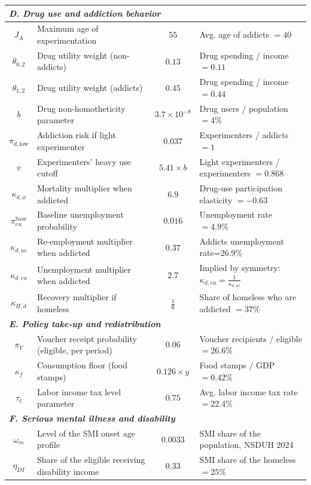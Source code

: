 \begin{table}[p]
\begin{center}
\begin{tabular}{clcl}
\midrule
\multicolumn{4}{l}{\textit{\textbf{D. Drug use and addiction behavior}}} \\
\midrule
$J_A$ & Maximum age of experimentation & $55$ & Avg. age of addicts $=40$ \\
$\theta_{0,2}$ & Drug utility weight (non-addicts) & $0.13$ & Drug spending / income $=0.11$ \\
$\theta_{1,2}$ & Drug utility weight (addicts) & $0.45$ & Drug spending / income $=0.44$ \\
$b$ & Drug non-homotheticity parameter & $3.7\times 10^{-8}$ & Drug users / population $=4\%$ \\
$\pi_{d,\text{low}}$ & Addiction risk if light experimenter & $0.037$ & Experimenters / addicts $=1$ \\
$\overline{v}$ & Experimenters' heavy use cutoff & $5.41 \times b$ & Light experimenters / experimenters $=0.868$ \\
$\kappa_{d,\phi}$ & Mortality multiplier when addicted & $6.9$ & Drug-use participation elasticity $=-0.63$ \\
$\pi^{\text{base}}_{eu}$ & Baseline unemployment probability & $0.016$ & Unemployment rate $=4.9\%$ \\
$\kappa_{d,ue}$ & Re-employment multiplier when addicted & $0.37$ & Addicts unemployment rate=26.9\%\\
$\kappa_{d,eu}$ & Unemployment multiplier when addicted & $2.7$ & Implied by symmetry: $\kappa_{d,eu}=\frac{1}{\kappa_{d,ue}}$ \\
$\kappa_{\underline H,d}$ & Recovery multiplier if homeless & $\frac{1}{6}$ & Share of homeless who are addicted $=37\%$\\
\midrule
\multicolumn{4}{l}{\textit{\textbf{E. Policy take-up and redistribution}}} \\
\midrule
$\pi_V$ & Voucher receipt probability (eligible, per period) & $0.06$ & Voucher recipients / eligible $=26.6\%$ \\
$\kappa_f$ & Consumption floor (food stamps) & $0.126\times \overline{y}$ & Food stamps / GDP $=0.42\%$ \\
$\tau_\ell$ & Labor income tax level parameter & $0.75$ & Avg. labor income tax rate $=22.4\%$ \\
\midrule
\multicolumn{4}{l}{\textit{\textbf{F. Serious mental illness and disability}}} \\
\midrule
$\omega_m$ & Level of the SMI onset age profile & $0.0033$ & SMI share of the population, NSDUH 2024 \\
$\eta_{DI}$ & Share of the eligible receiving disability income & $0.33$ & SMI share of the homeless $=25\%$ \\
\bottomrule
\bottomrule
\end{tabular}
\end{center}
\normalsize
\end{table}

